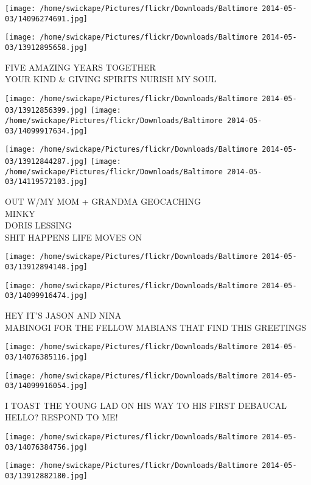\documentclass[10pt,letterpaper]{article}
\begin{document}
\texttt{[image: /home/swickape/Pictures/flickr/Downloads/Baltimore 2014-05-03/14096274691.jpg]}

\vspace{0.25in}
\texttt{[image: /home/swickape/Pictures/flickr/Downloads/Baltimore 2014-05-03/13912895658.jpg]}

FIVE AMAZING YEARS TOGETHER\\
YOUR KIND \& GIVING SPIRITS NURISH MY SOUL
\pagebreak

\texttt{[image: /home/swickape/Pictures/flickr/Downloads/Baltimore 2014-05-03/13912856399.jpg]}
\texttt{[image: /home/swickape/Pictures/flickr/Downloads/Baltimore 2014-05-03/14099917634.jpg]}

\texttt{[image: /home/swickape/Pictures/flickr/Downloads/Baltimore 2014-05-03/13912844287.jpg]}
\texttt{[image: /home/swickape/Pictures/flickr/Downloads/Baltimore 2014-05-03/14119572103.jpg]}

OUT W/MY MOM + GRANDMA GEOCACHING\\
MINKY\\
DORIS LESSING\\
SHIT HAPPENS LIFE MOVES ON
\pagebreak

\texttt{[image: /home/swickape/Pictures/flickr/Downloads/Baltimore 2014-05-03/13912894148.jpg]}

\vspace{0.25in}
\texttt{[image: /home/swickape/Pictures/flickr/Downloads/Baltimore 2014-05-03/14099916474.jpg]}

HEY IT'S JASON AND NINA\\
MABINOGI FOR THE FELLOW MABIANS THAT FIND THIS GREETINGS
\pagebreak

\texttt{[image: /home/swickape/Pictures/flickr/Downloads/Baltimore 2014-05-03/14076385116.jpg]}

\vspace{0.25in}
\texttt{[image: /home/swickape/Pictures/flickr/Downloads/Baltimore 2014-05-03/14099916054.jpg]}

I TOAST THE YOUNG LAD ON HIS WAY TO HIS FIRST DEBAUCAL\\
HELLO?  RESPOND TO ME!
\pagebreak

\texttt{[image: /home/swickape/Pictures/flickr/Downloads/Baltimore 2014-05-03/14076384756.jpg]}

\vspace{0.25in}
\texttt{[image: /home/swickape/Pictures/flickr/Downloads/Baltimore 2014-05-03/13912882180.jpg]}
\end{document}
